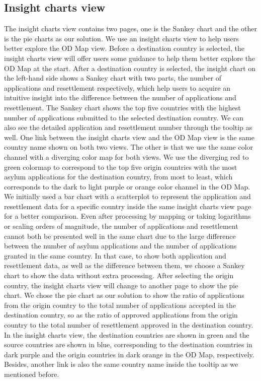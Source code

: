 \documentclass[journal]{vgtc}                %
\begin{document}
 \subsection{Insight charts view}
 The insight charts view contains two pages, one is the Sankey chart and the other is the pie charts as our solution. We use an insight charts view to help users better explore the OD Map view. Before a destination country is selected, the insight charts view will offer users some guidance to help them better explore the OD Map at the start.
 After a destination country is selected, the insight chart on the left-hand side shows a Sankey chart with two parts, the number of applications and resettlement respectively, which help users to acquire an intuitive insight into the difference between the number of applications and resettlement.
 The Sankey chart shows the top five countries with the highest number of applications submitted to the selected destination country. We can also see the detailed application and resettlement number through the tooltip as well. One link between the insight charts view and the OD Map view is the same country name shown on both two views. The other is that we use the same color channel with a diverging color map for both views. We use the diverging red to green colormap to correspond to the top five origin countries with the most asylum applications for the destination country, from most to least, which corresponds to the dark to light purple or orange color channel in the OD Map.
 We initially used a bar chart with a scatterplot to represent the application and resettlement data for a specific country inside the same insight charts view page for a better comparison. Even after processing by mapping or taking logarithms or scaling orders of magnitude, the number of applications and resettlement cannot both be presented well in the same chart due to the large difference between the number of asylum applications and the number of applications granted in the same country. In that case, to show both application and resettlement data, as well as the difference between them, we choose a Sankey chart to show the data without extra processing.
 After selecting the origin country, the insight charts view will change to another page to show the pie chart. We chose the pie chart as our solution to show the ratio of applications from the origin country to the total number of applications accepted in the destination country, so as the ratio of approved applications from the origin country to the total number of resettlement approved in the destination country. In the insight charts view, the destination countries are shown in green and the source countries are shown in blue, corresponding to the destination countries in dark purple and the origin countries in dark orange in the OD Map, respectively. Besides, another link is also the same country name inside the tooltip as we mentioned before.
\end{document}
